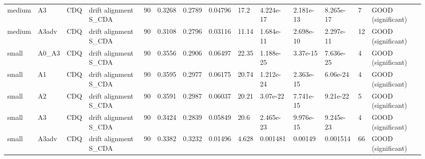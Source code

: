\begin{table}[t]
\begin{tabular}{llllllllllllll}
medium & A3 & CDQ & drift alignment S\_CDA & 90 & 0.3268 & 0.2789 & 0.04796 & 17.2 & 4.224e-17 & 2.181e-13 & 8.265e-17 & 7 & GOOD (significant) \\
medium & A3adv & CDQ & drift alignment S\_CDA & 90 & 0.3108 & 0.2796 & 0.03116 & 11.14 & 1.684e-11 & 2.698e-10 & 2.297e-11 & 12 & GOOD (significant) \\
small & A0\_A3 & CDQ & drift alignment S\_CDA & 90 & 0.3556 & 0.2906 & 0.06497 & 22.35 & 1.188e-25 & 3.37e-15 & 7.636e-25 & 4 & GOOD (significant) \\
small & A1 & CDQ & drift alignment S\_CDA & 90 & 0.3595 & 0.2977 & 0.06175 & 20.74 & 1.212e-24 & 2.363e-15 & 6.06e-24 & 4 & GOOD (significant) \\
small & A2 & CDQ & drift alignment S\_CDA & 90 & 0.3591 & 0.2987 & 0.06037 & 20.21 & 3.07e-22 & 7.741e-15 & 9.21e-22 & 5 & GOOD (significant) \\
small & A3 & CDQ & drift alignment S\_CDA & 90 & 0.3424 & 0.2839 & 0.05849 & 20.6 & 2.465e-23 & 9.976e-15 & 9.245e-23 & 4 & GOOD (significant) \\
small & A3adv & CDQ & drift alignment S\_CDA & 90 & 0.3382 & 0.3232 & 0.01496 & 4.628 & 0.001481 & 0.00149 & 0.001514 & 66 & GOOD (significant) \\
\bottomrule
\end{tabular}
\end{table}